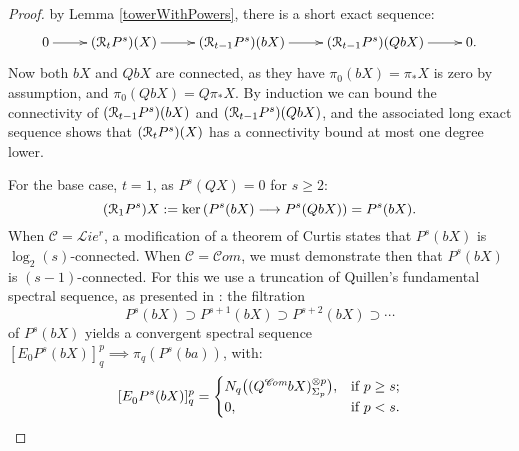 \documentclass[11pt]{amsart} \renewcommand{\baselinestretch}{1.2}
\theoremstyle{plain}
\theoremstyle{definition}
\renewcommand{\ker}{\mathrm{ker}\,}
\renewcommand{\to}{\longrightarrow}
\newcommand{\scrL}{\mathscr{L}}
\newcommand{\scrC}{\mathscr{C}}
\newcommand{\calR}{\mathcal{R}}
\newcommand{\calc}{\mathcal{C}}
\newcommand{\citeBOX}[2][]{\cite[\mbox{#1}]{#2}}
\newcommand{\algs}{{\scrC\!\textit{om}}}
\newcommand{\restliealgs}{{\scrL\!\textit{ie}^\textit{r}}}
\newcommand{\algcat}{{\calc}}%
\newcommand{\E}[5]{[E^{#1}_{#2}#3]^{#4}_{#5}}
\newcommand{\caldup}[1]{\calR_{\smash{#1}}}
\newcommand{\barConstructionMightAbbreviate}{b}
\begin{document}
\begin{Bousfield-Kan spectral sequence}
\begin{proof}
by Lemma \ref{towerWithPowers}, there is a short exact sequence:
\[\xymatrix{
0\ar[r]&
(\caldup{t}P^{s})(X)\ar[r]&
(\caldup{t-1}P^{s})(\barConstructionMightAbbreviate X)\ar[r]&
(\caldup{t-1}P^{s})(Q\barConstructionMightAbbreviate X)\ar[r]&
0.
}\]
Now both $\barConstructionMightAbbreviate X$ and $Q\barConstructionMightAbbreviate X$ are connected, as they have $\pi_0(\barConstructionMightAbbreviate X)=\pi_*X$ is zero by assumption, and $\pi_0(Q\barConstructionMightAbbreviate X)=Q\pi_*X$. By induction we can bound the connectivity of $(\caldup{t-1}P^{s})(\barConstructionMightAbbreviate X)$ and $(\caldup{t-1}P^{s})(Q\barConstructionMightAbbreviate X)$, and the associated long exact sequence shows that $(\caldup{t}P^{s})(X)$ has a connectivity bound at most one degree lower.


For the base case, $t=1$, as $P^s(QX)=0$ for $s\geq2$:
\[(\caldup{1}P^{s})X:=\ker(P^{s}(\barConstructionMightAbbreviate X)\to P^{s}(Q\barConstructionMightAbbreviate X))=P^{s}(\barConstructionMightAbbreviate X).\]
When $\algcat=\restliealgs$, a modification \citeBOX[4.3]{6Author.pdf} of a theorem of Curtis \citeBOX[\S5]{Curtis_LCS.pdf} states that $P^{s}(\barConstructionMightAbbreviate X)$ is $\log_2(s)$-connected.
When $\algcat=\algs$, we must demonstrate then that $P^s(\barConstructionMightAbbreviate X)$ is $(s-1)$-connected. For this
 we use a truncation of Quillen's fundamental spectral sequence, as presented in \cite[Theorem 6.2]{MR1089001}: the filtration
\[P^s(\barConstructionMightAbbreviate X)\supset P^{s+1}(\barConstructionMightAbbreviate X)\supset P^{s+2}(\barConstructionMightAbbreviate X)\supset\cdots \]
of $P^s(\barConstructionMightAbbreviate X)$ yields a convergent spectral sequence  $\E{}{0}{P^s(\barConstructionMightAbbreviate X)}{p}{q}\implies \pi_q(P^s(\barConstructionMightAbbreviate a))$, with:
\[\E{}{0}{P^s(\barConstructionMightAbbreviate X)}{p}{q}=
\begin{cases}
N_q\bigl((Q^{\algs}\barConstructionMightAbbreviate X)^{\otimes p}_{\Sigma_p}\bigr),&\textup{if }p\geq s;\\
0,&\textup{if }p<s.
\end{cases}\]

\end{proof}
\end{Bousfield-Kan spectral sequence}
\end{document}
